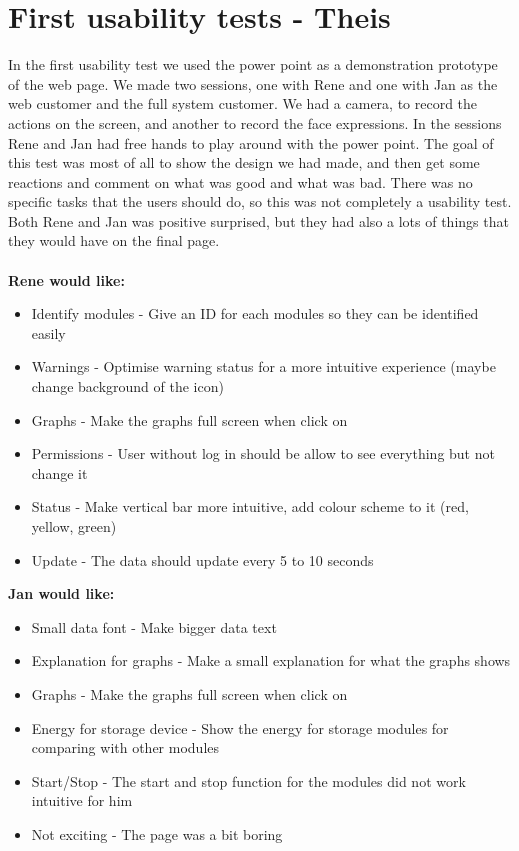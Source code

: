 \section{First usability tests - Theis}
In the first usability test we used the power point as a demonstration prototype of the web page. We made two sessions, one with Rene and one with Jan as the web customer and the full system customer. We had a camera, to record the actions on the screen, and another to record the face expressions. In the sessions Rene and Jan had free hands to play around with the power point. The goal of this test was most of all to show the design we had made, and then get some reactions and comment on what was good and what was bad. There was no specific tasks that the users should do, so this was not completely a usability test. Both Rene and Jan was positive surprised, but they had also a lots of things that they would have on the final page.\\\\
\textbf{Rene would like:}
\begin{itemize}
	\item Identify modules - Give an ID for each modules so they can be identified easily
	\item Warnings - Optimise warning status for a more intuitive experience (maybe change background of the icon)
	\item Graphs - Make the graphs full screen when click on
	\item Permissions - User without log in should be allow to see everything but not change it
	\item Status - Make vertical bar more intuitive, add colour scheme to it (red, yellow, green)
	\item Update - The data should update every 5 to 10 seconds
\end{itemize}
\textbf{Jan would like:}
\begin{itemize}
	\item Small data font - Make bigger data text
	\item Explanation for graphs - Make a small explanation for what the graphs shows
	\item Graphs - Make the graphs full screen when click on
	\item Energy for storage device - Show the energy for storage modules for comparing with other modules
	\item Start/Stop - The start and stop function for the modules did not work intuitive for him
	\item Not exciting - The page was a bit boring
\end{itemize}
